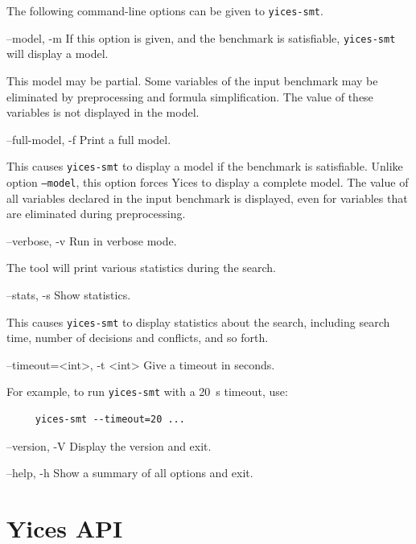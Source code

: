 \documentclass[11pt,twoside,fleqn,openright,titlepage]{cslreport}
\newenvironment{options}{
\begin{list}{}{
\setlength{\labelsep}{1.8ex}
\setlength{\labelwidth}{0pt}
\setlength{\itemindent}{-0.5\leftmargin}
\settowidth{\leftmargin}{\texttt{--}}
\renewcommand{\makelabel}{\optionlabel}}}
{\end{list}}
\newcommand*\optionlabel[1]{\hspace\labelsep\texttt{#1}}
\begin{document}
The following command-line options can be given to \texttt{yices-smt}.
\begin{options}
\item[--model, -m] If this option is given, and the benchmark
  is satisfiable, \texttt{yices-smt} will display a model.

  This model may be partial. Some variables of the input benchmark may
  be eliminated by preprocessing and formula simplification. The value
  of these variables is not displayed in the model.

\item[--full-model, -f] Print a full model.

  This causes \texttt{yices-smt} to display a model if the benchmark
  is satisfiable. Unlike option \texttt{--model}, this option forces
  Yices to display a complete model. The value of all variables
  declared in the input benchmark is displayed, even for variables
  that are eliminated during preprocessing.

\item[--verbose, -v] Run in verbose mode.

  The tool will print various statistics during the search.

\item[--stats, -s] Show statistics.

  This causes \texttt{yices-smt} to display statistics about the
  search, including search time, number of decisions and conflicts,
  and so forth.

\item[--timeout=<int>, -t <int>] Give a timeout in seconds.

  For example, to run \texttt{yices-smt} with a 20~s timeout, use:
  \begin{small}
  \vspace*{-2mm}
  \begin{verbatim}
     yices-smt --timeout=20 ...
  \end{verbatim}
  \vspace*{-7mm}
  \end{small}
\item[--version, -V] Display the version and exit.

\item[--help, -h] Show a summary of all options and exit.
\end{options}

\chapter{Yices API}
\label{yices-api}
\end{document}
